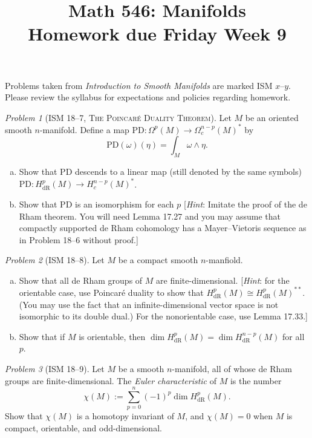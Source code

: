 \documentclass[11pt,twoside]{amsart}
\title{Math 546: Manifolds\\ Homework due Friday Week 9}
\theoremstyle{plain}
\theoremstyle{remark}
\newtheorem{prob}{Problem}
\theoremstyle{definition}
\theoremstyle{definition}
\newcommand{\dR}{\mathrm{dR}}
\newcommand{\PD}{\mathrm{PD}}
\begin{document}
\maketitle

\noindent Problems taken from \emph{Introduction to Smooth Manifolds} are marked ISM $x$--$y$. Please review the syllabus for expectations and policies regarding homework.

\begin{prob}[ISM 18--7, \textsc{The Poincar\'e Duality Theorem}]
Let $M$ be an oriented smooth $n$-manifold. Define a map $\PD\colon \Omega^p(M)\to \Omega^{n-p}_c(M)^*$ by
\[
  \PD(\omega)(\eta) = \int_M \omega\wedge \eta.
\]
\begin{enumerate}[(a)]
\item Show that $\PD$ descends to a linear map (still denoted by the same symbols) $\PD\colon H_{\dR}^p(M)\to H^{n-p}_c(M)^*$.
\item Show that $\PD$ is an isomorphism for each $p$ [\emph{Hint}: Imitate the proof of the de Rham theorem. You will need Lemma 17.27 and you may assume that compactly supported de Rham cohomology has a Mayer--Vietoris sequence as in Problem 18--6 without proof.]
\end{enumerate}
\end{prob}

\begin{prob}[ISM 18--8]
Let $M$ be a compact smooth $n$-manfiold.
\begin{enumerate}[(a)]
\item Show that all de Rham groups of $M$ are finite-dimensional. [\emph{Hint}: for the orientable case, use Poincar\'e duality to show that $H^p_{\dR}(M)\cong H^p_{\dR}(M)^{**}$. (You may use the fact that an infinite-dimensional vector space is not isomorphic to its double dual.) For the nonorientable case, use Lemma 17.33.]
\item Show that if $M$ is orientable, then $\dim H^p_{\dR}(M) = \dim H^{n-p}_{\dR}(M)$ for all $p$.
\end{enumerate}
\end{prob}

\begin{prob}[ISM 18--9]
Let $M$ be a smooth $n$-manifold, all of whose de Rham groups are finite-dimensional. The \emph{Euler characteristic} of $M$ is the number
\[
  \chi(M) := \sum_{p=0}^n (-1)^p\dim H^p_{\dR}(M).
\]
Show that $\chi(M)$ is a homotopy invariant of $M$, and $\chi(M)=0$ when $M$ is compact, orientable, and odd-dimensional.
\end{prob}
\end{document}
